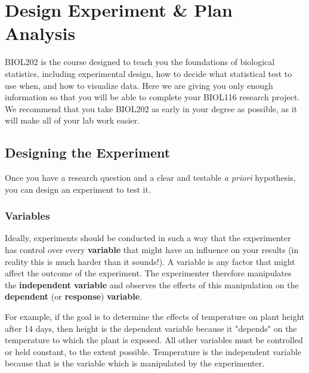 \documentclass[
]{book}
\begin{document}
\hypertarget{design-experiment-plan-analysis}{%
\chapter*{Design Experiment \& Plan Analysis}\label{design-experiment-plan-analysis}}

BIOL202 is the course designed to teach you the foundations of biological statistics, including experimental design, how to decide what statistical test to use when, and how to visualize data. Here we are giving you only enough information so that you will be able to complete your BIOL116 research project. We recommend that you take BIOL202 as early in your degree as possible, as it will make all of your lab work easier.

\hypertarget{designing-the-experiment}{%
\section*{Designing the Experiment}\label{designing-the-experiment}}

Once you have a research question and a clear and testable \emph{a priori} hypothesis, you can design an experiment to test it.

\hypertarget{variables}{%
\subsection*{Variables}\label{variables}}

Ideally, experiments should be conducted in such a way that the experimenter has control over every \textbf{variable} that might have an influence on your results (in reality this is much harder than it sounds!). A variable is any factor that might affect the outcome of the experiment. The experimenter therefore manipulates the \textbf{independent variable} and observes the effects of this manipulation on the \textbf{dependent} (or \textbf{response}) \textbf{variable}.

For example, if the goal is to determine the effects of temperature on plant height after 14 days, then height is the dependent variable because it "depends" on the temperature to which the plant is exposed. All other variables must be controlled or held constant, to the extent possible. Temperature is the independent variable because that is the variable which is manipulated by the experimenter.
\end{document}
